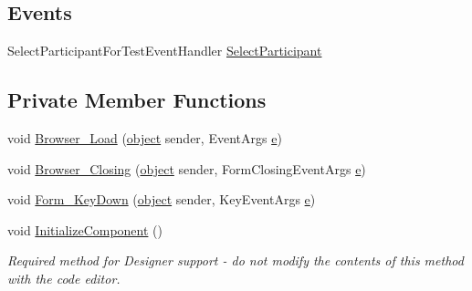 \subsection*{Events}
\begin{DoxyCompactItemize}
\item 
Select\+Participant\+For\+Test\+Event\+Handler \hyperlink{class_web_analyzer_1_1_u_i_1_1_select_participant_form_af1734ad8760e4e4f42579efafcb7299d}{Select\+Participant}
\end{DoxyCompactItemize}
\subsection*{Private Member Functions}
\begin{DoxyCompactItemize}
\item 
void \hyperlink{class_web_analyzer_1_1_u_i_1_1_select_participant_form_aefcdb86bf5200fb949cc002a8add0316}{Browser\+\_\+\+Load} (\hyperlink{_u_i_2_h_t_m_l_resources_2js_2lib_2underscore_8min_8js_aae18b7515bb2bc4137586506e7c0c903}{object} sender, Event\+Args \hyperlink{_u_i_2_h_t_m_l_resources_2js_2lib_2bootstrap_8min_8js_ab5902775854a8b8440bcd25e0fe1c120}{e})
\item 
void \hyperlink{class_web_analyzer_1_1_u_i_1_1_select_participant_form_a39ad877dec5c62b26919b009b2d43d6d}{Browser\+\_\+\+Closing} (\hyperlink{_u_i_2_h_t_m_l_resources_2js_2lib_2underscore_8min_8js_aae18b7515bb2bc4137586506e7c0c903}{object} sender, Form\+Closing\+Event\+Args \hyperlink{_u_i_2_h_t_m_l_resources_2js_2lib_2bootstrap_8min_8js_ab5902775854a8b8440bcd25e0fe1c120}{e})
\item 
void \hyperlink{class_web_analyzer_1_1_u_i_1_1_select_participant_form_aa267fe6901f149b1fabdbf066f39c0dc}{Form\+\_\+\+Key\+Down} (\hyperlink{_u_i_2_h_t_m_l_resources_2js_2lib_2underscore_8min_8js_aae18b7515bb2bc4137586506e7c0c903}{object} sender, Key\+Event\+Args \hyperlink{_u_i_2_h_t_m_l_resources_2js_2lib_2bootstrap_8min_8js_ab5902775854a8b8440bcd25e0fe1c120}{e})
\item 
void \hyperlink{class_web_analyzer_1_1_u_i_1_1_select_participant_form_a2b1279836194db1d202398585f7a7712}{Initialize\+Component} ()
\begin{DoxyCompactList}\small\item\em Required method for Designer support -\/ do not modify the contents of this method with the code editor. \end{DoxyCompactList}\end{DoxyCompactItemize}
